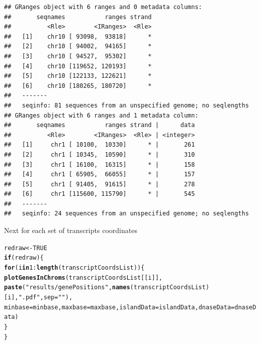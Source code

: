 \documentclass[a4paper,10pt]{article}\usepackage[]{graphicx}\usepackage[]{color}
\makeatletter
\newcommand{\hlnum}[1]{\textcolor[rgb]{0.686,0.059,0.569}{#1}}%
\newcommand{\hlstr}[1]{\textcolor[rgb]{0.192,0.494,0.8}{#1}}%
\newcommand{\hlopt}[1]{\textcolor[rgb]{0,0,0}{#1}}%
\newcommand{\hlstd}[1]{\textcolor[rgb]{0.345,0.345,0.345}{#1}}%
\newcommand{\hlkwa}[1]{\textcolor[rgb]{0.161,0.373,0.58}{\textbf{#1}}}%
\newcommand{\hlkwb}[1]{\textcolor[rgb]{0.69,0.353,0.396}{#1}}%
\newcommand{\hlkwc}[1]{\textcolor[rgb]{0.333,0.667,0.333}{#1}}%
\newcommand{\hlkwd}[1]{\textcolor[rgb]{0.737,0.353,0.396}{\textbf{#1}}}%
\newenvironment{kframe}{%
 \def\at@end@of@kframe{}%
 \ifinner\ifhmode%
  \def\at@end@of@kframe{\end{minipage}}%
  \begin{minipage}{\columnwidth}%
 \fi\fi%
 \def\FrameCommand##1{\hskip\@totalleftmargin \hskip-\fboxsep
 \colorbox{shadecolor}{##1}\hskip-\fboxsep
     \hskip-\linewidth \hskip-\@totalleftmargin \hskip\columnwidth}%
 \MakeFramed {\advance\hsize-\width
   \@totalleftmargin\z@ \linewidth\hsize
   \@setminipage}}%
 {\par\unskip\endMakeFramed%
 \at@end@of@kframe}
\newenvironment{knitrout}{}{} %
\makeatother
\begin{document}
\begin{knitrout}
\color{fgcolor}\begin{kframe}
\begin{verbatim}
## GRanges object with 6 ranges and 0 metadata columns:
##       seqnames           ranges strand
##          <Rle>        <IRanges>  <Rle>
##   [1]    chr10 [ 93098,  93818]      *
##   [2]    chr10 [ 94002,  94165]      *
##   [3]    chr10 [ 94527,  95302]      *
##   [4]    chr10 [119652, 120193]      *
##   [5]    chr10 [122133, 122621]      *
##   [6]    chr10 [180265, 180720]      *
##   -------
##   seqinfo: 81 sequences from an unspecified genome; no seqlengths
## GRanges object with 6 ranges and 1 metadata column:
##       seqnames           ranges strand |      data
##          <Rle>        <IRanges>  <Rle> | <integer>
##   [1]     chr1 [ 10100,  10330]      * |       261
##   [2]     chr1 [ 10345,  10590]      * |       310
##   [3]     chr1 [ 16100,  16315]      * |       158
##   [4]     chr1 [ 65905,  66055]      * |       157
##   [5]     chr1 [ 91405,  91615]      * |       278
##   [6]     chr1 [115600, 115790]      * |       545
##   -------
##   seqinfo: 24 sequences from an unspecified genome; no seqlengths
\end{verbatim}
\end{kframe}
\end{knitrout}

Next for each set of transcripts coordinates 

\begin{knitrout}
\color{fgcolor}\begin{kframe}
\begin{alltt}
\hlstd{redraw} \hlkwb{<-} \hlnum{TRUE}
\hlkwa{if} \hlstd{(redraw)\{}
  \hlkwa{for} \hlstd{(i} \hlkwa{in} \hlnum{1}\hlopt{:}\hlkwd{length}\hlstd{(transcriptCoordsList))\{}
    \hlkwd{plotGenesInChroms} \hlstd{(transcriptCoordsList[[i]],}
                       \hlkwd{paste}\hlstd{(}\hlstr{"results/genePositions"}\hlstd{,} \hlkwd{names}\hlstd{(transcriptCoordsList)[i],}\hlstr{".pdf"}\hlstd{,} \hlkwc{sep}\hlstd{=}\hlstr{""}\hlstd{),}
                       \hlkwc{minbase}\hlstd{=minbase,} \hlkwc{maxbase}\hlstd{=maxbase,} \hlkwc{islandData}\hlstd{=islandData,} \hlkwc{dnaseData}\hlstd{=dnaseData)}
  \hlstd{\}}
\hlstd{\}}
\end{alltt}
\end{kframe}
\end{knitrout}
\end{document}
